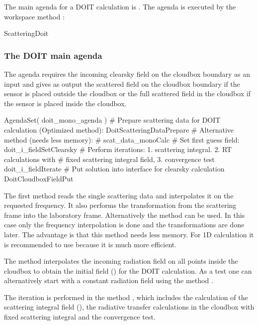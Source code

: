 The main agenda for a DOIT calculation is
. 
The agenda is executed by the workspace method
:
\begin{code}
ScatteringDoit
\end{code}

\subsubsection{The DOIT main agenda}
\label{sec:scattering:doit_main_agenda}

The agenda  requires the incoming
clearsky field on the cloudbox boundary as an input and gives as
output the scattered field on the cloudbox boundary if the sensor is
placed outside the cloudbox or the full scattered field in the
cloudbox if the sensor is placed inside the cloudbox.
\begin{code}
AgendaSet( doit_mono_agenda ){
 # Prepare scattering data for DOIT calculation (Optimized method):
   DoitScatteringDataPrepare
 # Alternative method (needs less memory):
 # scat_data_monoCalc
 # Set first guess field:		
   doit_i_fieldSetClearsky
 # Perform iterations: 1. scattering integral. 2. RT calculations with 
 #   fixed scattering integral field, 3. convergence test 
   doit_i_fieldIterate
 # Put solution into interface for clearsky calculation   
   DoitCloudboxFieldPut
 }		
\end{code}
The first method  reads the
single scattering data and interpolates it on the requested
frequency. It also performs the transformation from the scattering
frame into the laboratory frame. Alternatively the method
 can be used. In this case only the
frequency interpolation is done and the transformations are done
later. The advantage is that this method needs less memory. For 1D
calculation it is recommended to use
 because it is much more
efficient. 

The method  interpolates the
incoming radiation field on all points inside the cloudbox to obtain
the initial field () for the DOIT calculation. 
As a test one can alternatively start with a constant radiation field
using the method . 

The iteration is performed in the method
, which includes the calculation of
the scattering integral field (), the
radiative transfer calculations in 
the cloudbox with fixed scattering integral and the convergence test.

